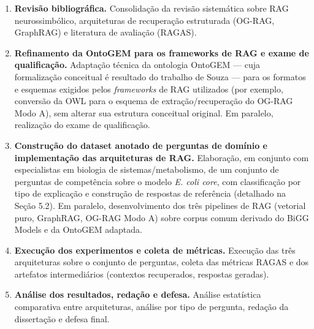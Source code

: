 \documentclass{article}
\begin{document}
\begin{enumerate}
	\item \textbf{Revisão bibliográfica.} Consolidação da revisão sistemática sobre RAG neurossimbólico, arquiteturas de recuperação estruturada (OG-RAG, GraphRAG) e literatura de avaliação (RAGAS).
	\item \textbf{Refinamento da OntoGEM para os frameworks de RAG e exame de qualificação.} Adaptação técnica da ontologia OntoGEM \cite{souza2025ontogem} --- cuja formalização conceitual é resultado do trabalho de Souza \cite{souza2025ontogem} --- para os formatos e esquemas exigidos pelos \textit{frameworks} de RAG utilizados (por exemplo, conversão da OWL para o esquema de extração/recuperação do OG-RAG Modo A), sem alterar sua estrutura conceitual original. Em paralelo, realização do exame de qualificação.
	\item \textbf{Construção do dataset anotado de perguntas de domínio e implementação das arquiteturas de RAG.} Elaboração, em conjunto com especialistas em biologia de sistemas/metabolismo, de um conjunto de perguntas de competência sobre o modelo \textit{E. coli core}, com classificação por tipo de explicação e construção de respostas de referência (detalhado na Seção 5.2). Em paralelo, desenvolvimento dos três pipelines de RAG (vetorial puro, GraphRAG, OG-RAG Modo A) sobre corpus comum derivado do BiGG Models e da OntoGEM adaptada.
	\item \textbf{Execução dos experimentos e coleta de métricas.} Execução das três arquiteturas sobre o conjunto de perguntas, coleta das métricas RAGAS e dos artefatos intermediários (contextos recuperados, respostas geradas).
	\item \textbf{Análise dos resultados, redação e defesa.} Análise estatística comparativa entre arquiteturas, análise por tipo de pergunta, redação da dissertação e defesa final.
\end{enumerate}
\end{document}
